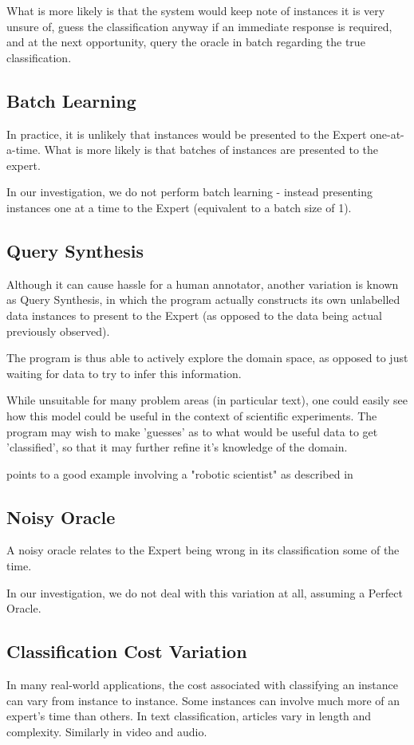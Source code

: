 \documentclass[a4paper,11pt]{report}
\begin{document}
What is more likely is that the system would keep note of instances it is very unsure of, guess the classification anyway if an immediate response is required, and at the next opportunity, query the oracle in batch regarding the true classification.

\subsection{Batch Learning}
In practice, it is unlikely that instances would be presented to the Expert one-at-a-time. What is more likely is that batches of instances are presented to the expert.

In our investigation, we do not perform batch learning - instead presenting instances one at a time to the Expert (equivalent to a batch size of 1).

\subsection{Query Synthesis}
Although it can cause hassle for a human annotator, another variation is known as Query Synthesis, in which the program actually constructs its own unlabelled data instances to present to the Expert (as opposed to the data being actual previously observed).

The program is thus able to actively explore the domain space, as opposed to just waiting for data to try to infer this information.

While unsuitable for many problem areas (in particular text), one could easily see how this model could be useful in the context of scientific experiments. The program may wish to make 'guesses' as to what would be useful data to get 'classified', so that it may further refine it's knowledge of the domain.

\citep{Settles2010} points to a good example involving a "robotic scientist" as described in \citep{King2009}

\subsection{Noisy Oracle}
A noisy oracle relates to the Expert being wrong in its classification some of the time.

In our investigation, we do not deal with this variation at all, assuming a Perfect Oracle.

\subsection{Classification Cost Variation}
In many real-world applications, the cost associated with classifying an instance can vary from instance to instance. Some instances can involve much more of an expert's time than others. In text classification, articles vary in length and complexity. Similarly in video and audio.
\end{document}
